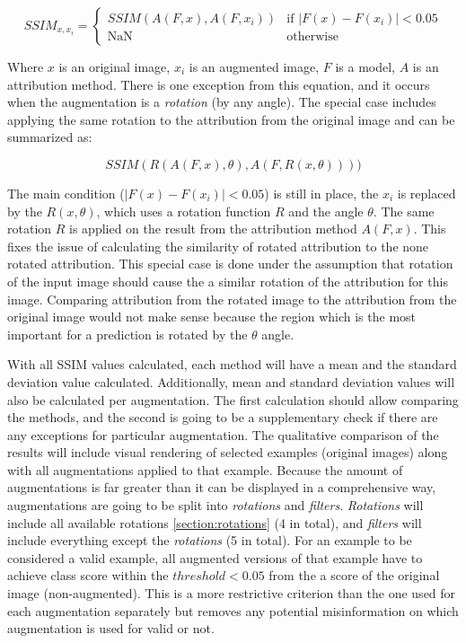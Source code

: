 \begin{equation}
    SSIM_{x, x_i} = \begin{cases} SSIM(A(F, x), A(F, x_i)) & \text{if } |F(x) - F(x_i)| < 0.05 \\ \text{NaN} & \text{otherwise} \end{cases}
\end{equation}

Where $x$ is an original image, $x_i$ is an augmented image, $F$ is a model, $A$ is an attribution method. There is one exception from this equation, and it occurs when the augmentation is a \textit{rotation} (by any angle). The special case includes applying the same rotation to the attribution from the original image and can be summarized as:

\begin{equation}
    SSIM( R(A( F, x ), \theta), A( F, R(x, \theta)) ))
\end{equation}

The main condition ($|F(x) - F(x_i)| < 0.05$) is still in place, the $x_i$ is replaced by the $R(x, \theta)$, which uses a rotation function $R$ and the angle $\theta$. The same rotation $R$ is applied on the result from the attribution method $A( F, x )$. This fixes the issue of calculating the similarity of rotated attribution to the none rotated attribution. This special case is done under the assumption that rotation of the input image should cause the a similar rotation of the attribution for this image. Comparing attribution from the rotated image to the attribution from the original image would not make sense because the region which is the most important for a prediction is rotated by the $\theta$ angle.

\vspace{\baselineskip}

With all SSIM values calculated, each method will have a mean and the standard deviation value calculated. Additionally, mean and standard deviation values will also be calculated per augmentation. The first calculation should allow comparing the methods, and the second is going to be a supplementary check if there are any exceptions for particular augmentation. The qualitative comparison of the results will include visual rendering of selected examples (original images) along with all augmentations applied to that example. Because the amount of augmentations is far greater than it can be displayed in a comprehensive way, augmentations are going to be split into \textit{rotations} and \textit{filters}. \textit{Rotations} will include all available rotations \ref{section:rotations} (4 in total), and \textit{filters} will include everything except the \textit{rotations} (5 in total). For an example to be considered a valid example, all augmented versions of that example have to achieve class score within the $threshold < 0.05$ from the a score of the original image (non-augmented). This is a more restrictive criterion than the one used for each augmentation separately but removes any potential misinformation on which augmentation is used for valid or not.

